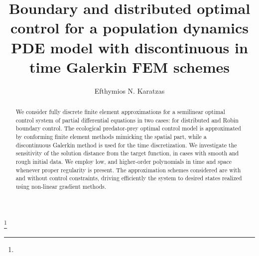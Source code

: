 \documentclass[a4paper,3pt]{amsart}
\theoremstyle{definition}
\theoremstyle{remark}
\numberwithin{equation}{section}
\numberwithin{equation}{section}
\numberwithin{figure}{section}
\begin{document}
%
\title[Lotka Volterra PDE systems]{Boundary and distributed optimal control for a  population dynamics PDE model  with %
 discontinuous  in time Galerkin %
FEM schemes%
}%
\author{Efthymios N. Karatzas}%
\address{School of Mathematics, Aristotle University of Thessaloniki, Thessaloniki 15780, Greece}%
%

\thanks{}%
\subjclass{}%
%

\begin{abstract}
We consider fully discrete finite element approximations for a semilinear optimal control system of partial differential equations in two cases: for
distributed and Robin boundary control. %
The ecological predator-prey optimal control model is approximated by conforming finite element methods mimicking the spatial part, while a discontinuous Galerkin method is used for the time discretization. We investigate the sensitivity of the solution distance from the target function, in cases with smooth and rough initial data. We employ low, and higher-order polynomials in time and space whenever proper regularity is present. The approximation schemes considered are with and without control constraints, driving efficiently the system to desired states realized using %
non-linear gradient methods.
\end{abstract}
\maketitle
 
\end{document}
